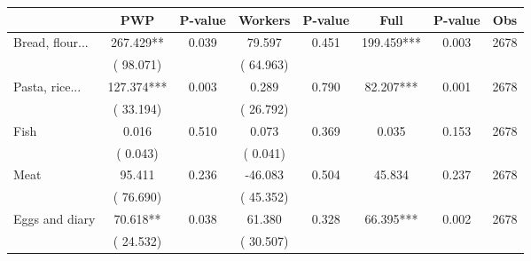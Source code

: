 
\begin{tabular}{l*{7}{c}}\hline&\multicolumn{1}{c}{PWP}&\multicolumn{1}{c}{P-value}&\multicolumn{1}{c}{Workers}&\multicolumn{1}{c}{P-value}&\multicolumn{1}{c}{Full}&\multicolumn{1}{c}{P-value}&\multicolumn{1}{c}{Obs} \\ \hline

 Bread, flour...       &            267.429**       &        0.039  &             79.597       &        0.451  &            199.459***       &              0.003 &  2678 \\ 
                       &       (      98.071)             &                               &       (      64.963)                     &                               &                                               &                                &                      \\ 

 Pasta, rice...       &            127.374***       &        0.003  &              0.289       &        0.790  &             82.207***       &              0.001 &  2678 \\ 
                       &       (      33.194)             &                               &       (      26.792)                     &                               &                                               &                                &                      \\ 

 Fish       &              0.016       &        0.510  &              0.073       &        0.369  &              0.035       &              0.153 &  2678 \\ 
                       &       (       0.043)             &                               &       (       0.041)                     &                               &                                               &                                &                      \\ 

 Meat       &             95.411       &        0.236  &            -46.083       &        0.504  &             45.834       &              0.237 &  2678 \\ 
                       &       (      76.690)             &                               &       (      45.352)                     &                               &                                               &                                &                      \\ 

 Eggs and diary       &             70.618**       &        0.038  &             61.380       &        0.328  &             66.395***       &              0.002 &  2678 \\ 
                       &       (      24.532)             &                               &       (      30.507)                     &                               &                                               &                                &                      \\ 


\end{tabular}
